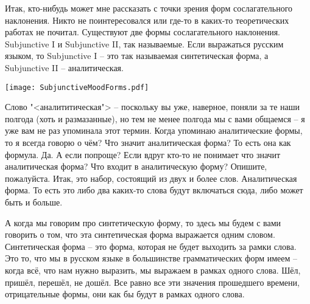 \documentclass[main.tex]{subfiles}
\begin{document}
Итак, кто-нибудь может мне рассказать с точки зрения форм сослагательного наклонения.
Никто не поинтересовался или где-то в каких-то теоретических работах не почитал.
Существуют две формы сослагательного наклонения.
Subjunctive I и Subjunctive II, так называемые.
Если выражаться русским языком, то Subjunctive I -- это так называемая синтетическая форма, а Subjunctive II -- аналитическая.

{\parindent0pt\texttt{[image: SubjunctiveMoodForms.pdf]}}

Слово "<аналититическая"> -- поскольку вы уже, наверное, поняли за те наши полгода (хоть и размазанные), но тем не менее полгода мы с вами общаемся -- я уже вам не раз упоминала этот термин.
Когда упоминаю аналитические формы, то я всегда говорю о чём?
Что значит аналитическая форма?
То есть она как формула.
Да.
А если попроще?
Если вдруг кто-то не понимает что значит аналитическая форма?
Что входит в аналитическую форму?
Опишите, пожалуйста.
Итак, это набор, состоящий из двух и более слов.
Аналитическая форма.
То есть это либо два каких-то слова будут включаться сюда, либо может быть и больше.

А когда мы говорим про синтетическую форму, то здесь мы будем с вами говорить о том, что эта синтетическая форма выражается одним словом.
Синтетическая форма -- это форма, которая не будет выходить за рамки слова.
Это то, что мы в русском языке в большинстве грамматических форм имеем -- когда всё, что нам нужно выразить, мы выражаем в рамках одного слова.
Шёл, пришёл, перешёл, не дошёл.
Все равно все эти значения прошедшего времени, отрицательные формы, они как бы будут в рамках одного слова.
\end{document}
